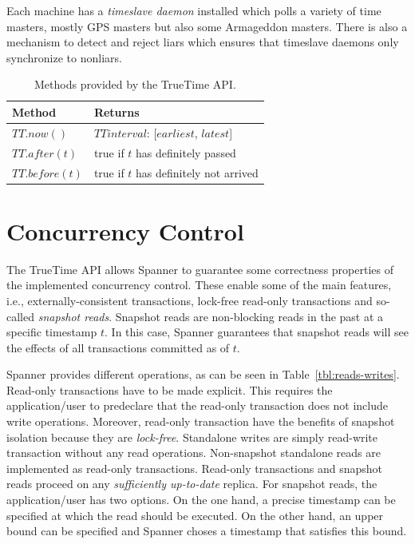 \documentclass[onecolumn, a4paper, 10pt]{article}
\begin{document}
Each machine has a \emph{timeslave daemon} installed which polls a variety of
time masters, mostly GPS masters but also some Armageddon masters. There is also
a mechanism to detect and reject liars which ensures that timeslave daemons only
synchronize to nonliars. 

\begin{table}[ht]
  \centering
  \begin{tabular}{|l||l|}
    \hline
    {\bfseries Method} & {\bfseries Returns} \tabularnewline
    \hline\hline
    $TT.now()$ & $TTinterval$: [$earliest$, $latest$] \tabularnewline
    \hline
    $TT.after(t)$ & true if $t$ has definitely passed \tabularnewline
    \hline
    $TT.before(t)$ & true if $t$ has definitely not arrived \tabularnewline
    \hline
  \end{tabular}
  \caption{Methods provided by the TrueTime API.}
  \label{tbl:truetime-api}
\end{table}

\section{Concurrency Control}
\label{sec:concurrency-control}

The TrueTime API allows Spanner to guarantee some correctness properties of the
implemented concurrency control. These enable some of the main features, i.e.,
externally-consistent transactions, lock-free read-only transactions and so-called
\emph{snapshot reads}. Snapshot reads are non-blocking reads in the past at a
specific timestamp $t$. In this case, Spanner guarantees that snapshot reads will
see the effects of all transactions committed as of $t$.

Spanner provides different operations, as can be seen in
Table~\ref{tbl:reads-writes}. Read-only transactions have to be made explicit.
This requires the application/user to predeclare that the read-only transaction
does not include write operations. Moreover, read-only transaction have the
benefits of snapshot isolation because they are \emph{lock-free}. Standalone
writes are simply read-write transaction without any read operations. Non-snapshot
standalone reads are implemented as read-only transactions. Read-only transactions
and snapshot reads proceed on any \emph{sufficiently up-to-date} replica. For
snapshot reads, the application/user has two options. On the one hand, a precise
timestamp can be specified at which the read should be executed. On the other
hand, an upper bound can be specified and Spanner choses a timestamp that
satisfies this bound. 
\end{document}
